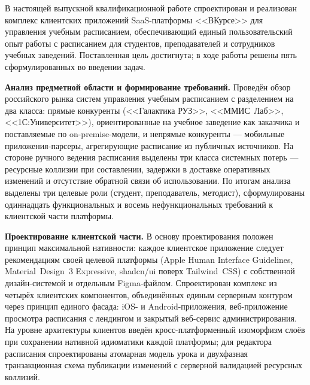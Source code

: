 

В настоящей выпускной квалификационной работе спроектирован и реализован комплекс клиентских приложений SaaS-платформы <<ВКурсе>> для управления учебным расписанием, обеспечивающий единый пользовательский опыт работы с расписанием для студентов, преподавателей и сотрудников учебных заведений. Поставленная цель достигнута; в ходе работы решены пять сформулированных во введении задач.

\textbf{Анализ предметной области и формирование требований.} Проведён обзор российского рынка систем управления учебным расписанием с разделением на два класса: прямые конкуренты (<<Галактика РУЗ>>, <<ММИС~Лаб>>, <<1С:Университет>>), ориентированные на учебное заведение как заказчика и поставляемые по on-premise-модели, и непрямые конкуренты --- мобильные приложения-парсеры, агрегирующие расписание из публичных источников. На стороне ручного ведения расписания выделены три класса системных потерь --- ресурсные коллизии при составлении, задержки в доставке оперативных изменений и отсутствие обратной связи об использовании. По итогам анализа выделены три целевые роли (студент, преподаватель, методист), сформулированы одиннадцать функциональных и восемь нефункциональных требований к клиентской части платформы.

\textbf{Проектирование клиентской части.} В основу проектирования положен принцип максимальной нативности: каждое клиентское приложение следует рекомендациям своей целевой платформы (Apple Human Interface Guidelines, Material~Design~3 Expressive, shadcn/ui поверх Tailwind~CSS) с собственной дизайн-системой и отдельным Figma-файлом. Спроектирован комплекс из четырёх клиентских компонентов, объединённых единым серверным контуром через принцип единого фасада: iOS- и Android-приложения, веб-приложение просмотра расписания с лендингом и закрытый веб-сервис администрирования. На уровне архитектуры клиентов введён кросс-платформенный изоморфизм слоёв при сохранении нативной идиоматики каждой платформы; для редактора расписания спроектированы атомарная модель урока и двухфазная транзакционная схема публикации изменений с серверной валидацией ресурсных коллизий.

